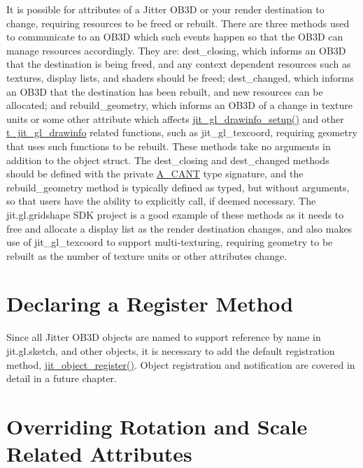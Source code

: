 It is possible for attributes of a Jitter OB3D or your render destination to change, requiring resources to be freed or rebuilt. There are three methods used to communicate to an OB3D which such events happen so that the OB3D can manage resources accordingly. They are: dest\_\-closing, which informs an OB3D that the destination is being freed, and any context dependent resources such as textures, display lists, and shaders should be freed; dest\_\-changed, which informs an OB3D that the destination has been rebuilt, and new resources can be allocated; and rebuild\_\-geometry, which informs an OB3D of a change in texture units or some other attribute which affects \hyperlink{group__ob3dmod_ga6b42cd2b3e58ff2c13d38b4bde52668d}{jit\_\-gl\_\-drawinfo\_\-setup()} and other \hyperlink{structt__jit__gl__drawinfo}{t\_\-jit\_\-gl\_\-drawinfo} related functions, such as jit\_\-gl\_\-texcoord, requiring geometry that uses such functions to be rebuilt. These methods take no arguments in addition to the object struct. The dest\_\-closing and dest\_\-changed methods should be defined with the private \hyperlink{group__atom_gga8aa6700e9f00b132eb376db6e39ade47af48193ec36e53b1507d81c49873c8d7a}{A\_\-CANT} type signature, and the rebuild\_\-geometry method is typically defined as typed, but without arguments, so that users have the ability to explicitly call, if deemed necessary. The jit.gl.gridshape SDK project is a good example of these methods as it needs to free and allocate a display list as the render destination changes, and also makes use of jit\_\-gl\_\-texcoord to support multi-\/texturing, requiring geometry to be rebuilt as the number of texture units or other attributes change.\hypertarget{chapter_jit_ob3ddetails_chapter_jit_ob3ddetails_reg}{}\section{Declaring a Register Method}\label{chapter_jit_ob3ddetails_chapter_jit_ob3ddetails_reg}
Since all Jitter OB3D objects are named to support reference by name in jit.gl.sketch, and other objects, it is necessary to add the default registration method, \hyperlink{group__objectmod_gabcf088a00f36b6af8ce5896b81e4d0ef}{jit\_\-object\_\-register()}. Object registration and notification are covered in detail in a future chapter.\hypertarget{chapter_jit_ob3ddetails_chapter_jit_ob3ddetails_rot}{}\section{Overriding Rotation and Scale Related Attributes}\label{chapter_jit_ob3ddetails_chapter_jit_ob3ddetails_rot}
